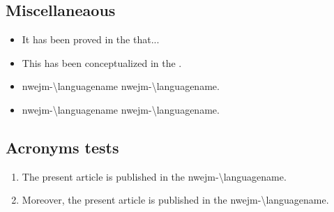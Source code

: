 \documentclass[english]{nwejmart}
\begin{document}
\subsection{Miscellaneaous}
\begin{itemize}
\item It has been proved in the  
  that...
\item This has been conceptualized in the  .
\item \acrshort{nwejm-\languagename} \ie{} \acrlong*{nwejm-\languagename}.
\item \acrshort{nwejm-\languagename} \ie*{} \acrlong*{nwejm-\languagename}.
\end{itemize}
%
\subsection{Acronyms tests}
\begin{enumerate}
\item The present article is published in the \gls{nwejm-\languagename}.
\item Moreover, the present article is published in the \gls{nwejm-\languagename}.
\end{enumerate}
%
\end{document}
